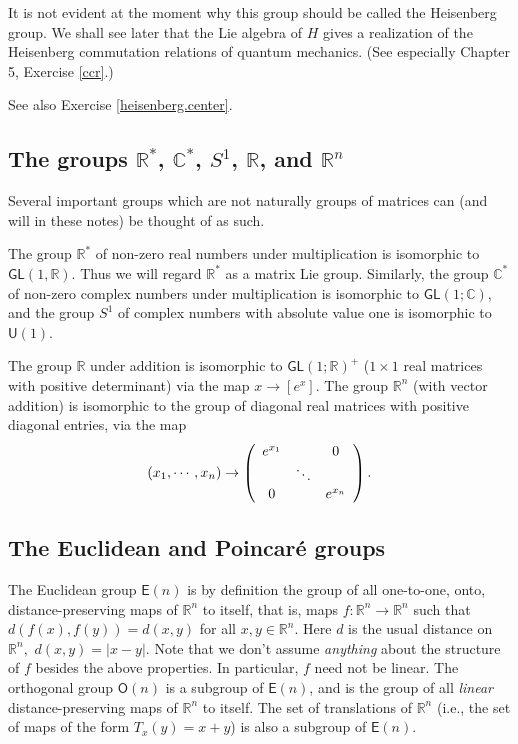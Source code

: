 \documentclass[12pt]{amsbook}
\theoremstyle{plain}
\numberwithin{equation}{chapter}
\numberwithin{theorem}{chapter}
\begin{document}
It is not evident at the moment why this group should be called the Heisenberg
group. We shall see later that the Lie algebra of $H$ gives a realization of
the Heisenberg commutation relations of quantum mechanics. (See especially
Chapter 5, Exercise \ref{ccr}.)

See also Exercise \ref{heisenberg.center}.

\subsection{The groups $\mathbb{R}^{\ast}$, $\mathbb{C}^{\ast}$, $S^{1}$,
$\mathbb{R}$, and $\mathbb{R}^{n}$}

Several important groups which are not naturally groups of matrices can (and
will in these notes) be thought of as such.

The group $\mathbb{R}^{*}$ of non-zero real numbers under multiplication is
isomorphic to $\mathsf{GL}(1,\mathbb{R})$. Thus we will regard $\mathbb{R}%
^{*}$ as a matrix Lie group. Similarly, the group $\mathbb{C}^{*}$ of non-zero
complex numbers under multiplication is isomorphic to $\mathsf{GL}%
(1;\mathbb{C})$, and the group $S^{1}$ of complex numbers with absolute value
one is isomorphic to $\mathsf{U}(1)$.

The group $\mathbb{R}$ under addition is isomorphic to $\mathsf{GL}%
(1;\mathbb{R})^{+}$ ($1\times1$ real matrices with positive determinant) via
the map $x\rightarrow\left[  e^{x}\right]  $. The group $\mathbb{R}^{n}$ (with
vector addition) is isomorphic to the group of diagonal real matrices with
positive diagonal entries, via the map
\[
(x_{1},\cdots,x_{n})\rightarrow\left(
\begin{array}
[c]{ccc}%
e^{x_{1}} &  & 0\\
& \ddots & \\
0 &  & e^{x_{n}}%
\end{array}
\right)  \text{.}%
\]

\subsection{The Euclidean and Poincar\'{e} groups}

The Euclidean group $\mathsf{E}(n)$ is by definition the group of all
one-to-one, onto, distance-preserving maps of $\mathbb{R}^{n}$ to itself, that
is, maps $f:\mathbb{R}^{n}\rightarrow\mathbb{R}^{n}$ such that $d\left(
f\left(  x\right)  ,f\left(  y\right)  \right)  =d\left(  x,y\right)  $ for
all $x,y\in\mathbb{R}^{n}.$ Here $d$ is the usual distance on $\mathbb{R}%
^{n},$ $d\left(  x,y\right)  =\left|  x-y\right|  .$ Note that we don't assume
\textit{anything} about the structure of $f$ besides the above properties. In
particular, $f$ need not be linear. The orthogonal group $\mathsf{O}(n)$ is a
subgroup of $\mathsf{E}(n)$, and is the group of all \textit{linear}
distance-preserving maps of $\mathbb{R}^{n}$ to itself. The set of
translations of $\mathbb{R}^{n}$ (i.e., the set of maps of the form
$T_{x}(y)=x+y$) is also a subgroup of $\mathsf{E}(n)$.
\end{document}
